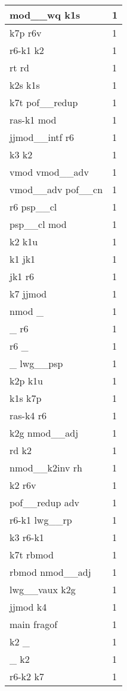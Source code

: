 \documentclass[a4 paper]{article}
\begin{document}
\begin{longtable}{p{}p{}}
mod\_\_wq k1s  & 1 \\ \midrule
k7p r6v  & 1 \\ \midrule
r6-k1 k2  & 1 \\ \midrule
rt rd  & 1 \\ \midrule
k2s k1s  & 1 \\ \midrule
k7t pof\_\_redup  & 1 \\ \midrule
ras-k1 mod  & 1 \\ \midrule
jjmod\_\_intf r6  & 1 \\ \midrule
k3 k2  & 1 \\ \midrule
vmod vmod\_\_adv  & 1 \\ \midrule
vmod\_\_adv pof\_\_cn  & 1 \\ \midrule
r6 psp\_\_cl  & 1 \\ \midrule
psp\_\_cl mod  & 1 \\ \midrule
k2 k1u  & 1 \\ \midrule
k1 jk1  & 1 \\ \midrule
jk1 r6  & 1 \\ \midrule
k7 jjmod  & 1 \\ \midrule
nmod \_  & 1 \\ \midrule
\_ r6  & 1 \\ \midrule
r6 \_  & 1 \\ \midrule
\_ lwg\_\_psp  & 1 \\ \midrule
k2p k1u  & 1 \\ \midrule
k1s k7p  & 1 \\ \midrule
ras-k4 r6  & 1 \\ \midrule
k2g nmod\_\_adj  & 1 \\ \midrule
rd k2  & 1 \\ \midrule
nmod\_\_k2inv rh  & 1 \\ \midrule
k2 r6v  & 1 \\ \midrule
pof\_\_redup adv  & 1 \\ \midrule
r6-k1 lwg\_\_rp  & 1 \\ \midrule
k3 r6-k1  & 1 \\ \midrule
k7t rbmod  & 1 \\ \midrule
rbmod nmod\_\_adj  & 1 \\ \midrule
lwg\_\_vaux k2g  & 1 \\ \midrule
jjmod k4  & 1 \\ \midrule
main fragof  & 1 \\ \midrule
k2 \_  & 1 \\ \midrule
\_ k2  & 1 \\ \midrule
r6-k2 k7  & 1 \\ \midrule

\end{longtable}
\end{document}
